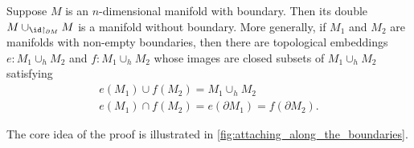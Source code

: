 \documentclass[notoc,notitlepage]{tufte-book}
\begin{document}
\begin{lemma}\label{lemma:attaching_manifolds_along_their_boundaries}
  Suppose $M$ is an $n$-dimensional manifold with boundary. Then its double 
  $M \cup_{\id \restriction_{\partial M}} M$ is a manifold without boundary.
  More generally, if $M_1$ and $M_2$ are manifolds with non-empty boundaries, then there are
  topological embeddings $e : M_1 \cup_h M_2$ and $f : M_1 \cup_h M_2$ whose images are closed
  subsets of $M_1 \cup_h M_2$ satisfying
  \begin{gather*}
    e(M_1) \cup f(M_2) = M_1 \cup_h M_2 \\
    e(M_1) \cap f(M_2) = e(\partial M_1) = f(\partial M_2).
  \end{gather*}
\end{lemma}

The core idea of the proof is illustrated in \cref{fig:attaching_along_the_boundaries}.
\end{document}
